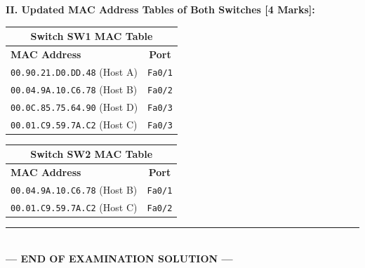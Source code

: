 \documentclass[11pt,a4paper]{article}
\begin{document}
\textbf{II. Updated MAC Address Tables of Both Switches [4 Marks]:}

\begin{center}
\begin{tabular}{|l|c|}
\multicolumn{2}{c}{\textbf{Switch SW1 MAC Table}} \\
\hline
\textbf{MAC Address} & \textbf{Port} \\
\hline
\texttt{00.90.21.D0.DD.48} (Host A) & \texttt{Fa0/1} \\
\texttt{00.04.9A.10.C6.78} (Host B) & \texttt{Fa0/2} \\
\texttt{00.0C.85.75.64.90} (Host D) & \texttt{Fa0/3} \\
\texttt{00.01.C9.59.7A.C2} (Host C) & \texttt{Fa0/3} \\
\hline
\end{tabular}
\qquad
\begin{tabular}{|l|c|}
\multicolumn{2}{c}{\textbf{Switch SW2 MAC Table}} \\
\hline
\textbf{MAC Address} & \textbf{Port} \\
\hline
\texttt{00.04.9A.10.C6.78} (Host B) & \texttt{Fa0/1} \\
\texttt{00.01.C9.59.7A.C2} (Host C) & \texttt{Fa0/2} \\
\hline
\end{tabular}
\end{center}

\begin{center}
    \rule{\textwidth}{0.8pt}\\[3pt]
    \textbf{\textcolor{primary}{--- END OF EXAMINATION SOLUTION ---}}
\end{center}
\end{document}
